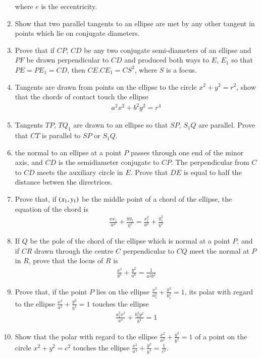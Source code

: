 \begin{enumerate}[label=\arabic*.,ref=\thesubsection.\theenumi]
where $e$ is the eccentricity.
\item Show that two parallel tangents to an ellipse are met by any other tangent in points
which lie on conjugate diameters.
\item Prove that if $CP$, $CD$ be any two conjugate semi-diameters of an ellipse and $PF$ be drawn
perpendicular to $CD$ and produced both ways to $E$, $E_1$ so that
$PE=PE_1=CD$, then $CE.CE_1=CS^2$, where $S$ is a focus.
\item Tangents are drawn from points on the ellipse to the circle $x^2+y^2=r^2$, show that the chords of contact touch
the ellipse
\begin{align*}
a^2x^2+b^2y^2 = r^4
\end{align*}
\item Tangents $TP$, $TQ_1$ are drawn to an ellipse so that $SP$, $S_1Q$ are parallel.  Prove that $CT$ is parallel to $SP$ or $S_1Q$.
\item the normal to an ellipse at a point $P$ passes through one end of the minor axis, and $CD$ is the semidiameter conjugate to $CP$.  The
perpendicular from $C$ to $CD$ meets the auxiliary circle in $E$.  Prove that $DE$ is equal to half the distance
betwen the directrices.
\item Prove that, if $\left(x_1,y_1\right)$ be the middle point of a chord of the ellipse, the equation of the chord is
\begin{align*}
\frac{xx_1}{a^2}+\frac{yy_1}{b^2} = \frac{x_1^2}{a^2}+\frac{y_1^2}{b^2}
\end{align*}
\item  If $Q$ be the pole of the chord of the ellipse which is normal at a point $P$, and if
$CR$ drawn through the centre $C$ perpendicular to $CQ$ meet the normal at $P$ in $R$, prove that the locus of $R$ is
\begin{align*}
\frac{x^2}{b^6}+\frac{y^2}{a^6} = \frac{1}{a^2b^2}
\end{align*}
\item Prove that, if the point $P$ lies on the ellipse $\frac{x^2}{a_1^2}+\frac{y^2}{b_1^2}=1$, its polar with regard to the 
ellipse $\frac{x^2}{a^2}+\frac{y^2}{b^2}=1$ touches
the ellipse
\begin{align*}
\frac{a_1^2x^2}{a^4}+\frac{b_1^2y^2}{b^4}=1
\end{align*}
\item Show that the polar with regard to the ellipse $\frac{x^2}{a^2}+\frac{y^2}{b^2}=1$ of a point on the circle ${x^2}+{y^2}=c^2$
 touches the ellipse $\frac{x^2}{a^4}+\frac{y^2}{b^4}=\frac{1}{c^2}$.

\end{enumerate}

